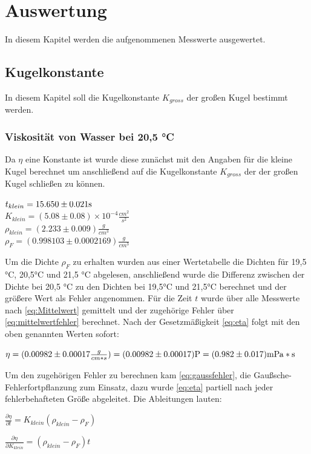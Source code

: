 \section{Auswertung}
\label{sec:auswertung}
In diesem Kapitel werden die aufgenommenen Messwerte ausgewertet.
\subsection{Kugelkonstante}
\label{sec:Kugelkonstante}
In diesem Kapitel soll die Kugelkonstante $K_{gross}$ der großen Kugel bestimmt werden.
\subsubsection{Viskosität von Wasser bei 20,5 °C}
\label{sec:viskositaet1}
Da $\eta$ eine Konstante ist wurde diese zunächst mit den Angaben für die kleine Kugel berechnet 
um anschließend auf die Kugelkonstante $K_{gross}$ der der großen Kugel schließen zu können.
\begin{center}
    $t_{klein}={15.650\pm0.021}\si[]{s}$\\
    $K_{klein}=(5.08\pm0.08)\times10^{-4} \frac{cm^2}{s^2}$\\
    $\rho_{klein}=(2.233\pm0.009) \frac{g}{cm^3}$\\
    $\rho_F=(0.998103\pm0.0002169)\frac{g}{cm^3}$
\end{center}
Um die Dichte $\rho_F$ zu erhalten wurden aus einer Wertetabelle die Dichten für 19,5 °C, 20,5°C und 21,5 °C abgelesen,
anschließend wurde die Differenz zwischen der Dichte bei 20,5 °C zu den Dichten bei 19,5°C und 21,5°C berechnet und
der größere Wert als  Fehler angenommen. Für die Zeit $t$ wurde über alle Messwerte nach \autoref{eq:Mittelwert} gemittelt 
und der zugehörige Fehler über \autoref{eq:mittelwertfehler} berechnet. Nach der Gesetzmäßigkeit \autoref{eq:eta}
folgt mit den oben genannten Werten sofort:
\begin{center}
    $\eta=(0.00982\pm0.00017\frac{g}{cm*s})=(0.00982\pm0.00017)\si[]{P}=(0.982\pm0.017)\si[]{mPa*s}$
\end{center}
Um den zugehörigen Fehler zu berechnen kam \autoref{eq:gaussfehler}, die Gaußsche-Fehlerfortpflanzung zum Einsatz,
dazu wurde \autoref{eq:eta} partiell nach jeder fehlerbehafteten Größe abgeleitet. Die Ableitungen lauten:
\begin{center}
    $\frac{\partial \eta}{\partial t}=K_{klein}\left(\rho_{klein}-\rho_F\right)$
\end{center} 
\begin{center}
    $\frac{\partial \eta}{\partial K_{klein}}=\left(\rho_{klein}-\rho_F\right)t$
\end{center}

